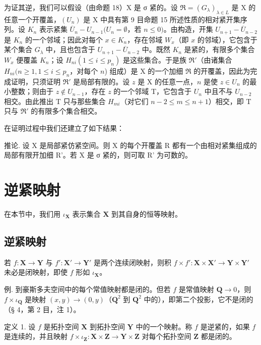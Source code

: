 为证其逆，我们可以假设（由命题 18）X 是 σ 紧的。设 \(\Re = (G_{\lambda})_{\lambda \in L}\) 是 X 的任意一个开覆盖，\((U_n)\) 是 X 中具有第 9 目命题 15 所述性质的相对紧开集序列。设 \(K_n\) 表示紧集 \(\overline{U}_n - U_{n-1}(U_n = \emptyset\)，若 \(n \leqslant 0)\)。由构造，开集 \(U_{n+1} - \overline{U}_{n-2}\) 是 \(K_n\) 的一个邻域；因此对每个 \(x \in K_n\)，存在邻域 \(W_x\)（即 \(x\) 的邻域），它包含于某个集合 \(G_{\lambda}\) 中，且也包含于 \(U_{n+1} - \overline{U}_{n-2}\) 中。既然 \(K_n\) 是紧的，有限多个集合 \(W_x\) 便覆盖 \(K_n\)；设 \(H_{ni}(1 \leqslant i \leqslant p_n)\) 是这些集合。于是族 \(\Re'\)（由诸集合 \(H_{ni}(n \geqslant 1, 1 \leqslant i \leqslant p_n\)，对每个 \(n\)) 组成）是 X 的一个加细 \(\Re\) 的开覆盖，因此为完成证明，只须证明 \(\Re'\) 是局部有限的。设 \(z\) 是 X 的任意一点，\(n\) 是使 \(z \in U_n\) 的最小整数；则由于 \(z \notin U_{n-1}\)，存在 \(z\) 的一个邻域 T，它包含于 \(U_n\) 中且不与 \(U_{n-2}\) 相交。由此推出 T 只与那些集合 \(H_{mi}\)（对它们 \(n - 2 \leqslant m \leqslant n + 1\)）相交，即 T 只与 \(\Re'\) 的有限多个集合相交。

在证明过程中我们还建立了如下结果：

推论. 设 X 是局部紧仿紧空间。则 X 的每个开覆盖 R 都有一个由相对紧集组成的局部有限开加细 R'。若 X 是 σ 紧的，则可取 R' 为可数的。

\section{逆紧映射}

在本节中，我们用 \(\iota_{\mathbf{X}}\) 表示集合 \(\mathbf{X}\) 到其自身的恒等映射。

\subsection{逆紧映射}

若 \(f: \mathbf{X} \to \mathbf{Y}\) 与 \(f': \mathbf{X}' \to \mathbf{Y}'\) 是两个连续闭映射，则积 \(f \times f': \mathbf{X} \times \mathbf{X}' \to \mathbf{Y} \times \mathbf{Y}'\) 未必是闭映射，即使 \(f\) 形如 \(\iota_{\mathbf{X}}\)。

例. 到豪斯多夫空间中的每个常值映射都是闭的。但若 \(f\) 是常值映射 \(\mathbf{Q} \to 0\)，则 \(f \times \iota_{\mathbf{Q}}\) 是映射 \((x, y) \to (0, y)\)（\(\mathbf{Q}^2\) 到 \(\mathbf{Q}^2\) 中的），即第二个投影，它不是闭的（§ 4，第 2 目，注 1）。

定义 1. 设 \(f\) 是拓扑空间 \(\mathbf{X}\) 到拓扑空间 \(\mathbf{Y}\) 中的一个映射。称 \(f\) 是逆紧的，如果 \(f\) 是连续的，并且映射 \(f \times \iota_{\mathbf{Z}} : \mathbf{X} \times \mathbf{Z} \to \mathbf{Y} \times \mathbf{Z}\) 对每个拓扑空间 \(\mathbf{Z}\) 都是闭的。

